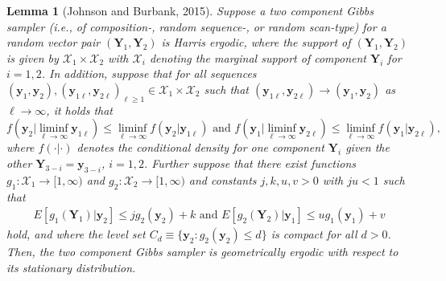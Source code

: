 \documentclass[12pt]{article}
\newtheorem{lemma}{Lemma}
\theoremstyle{definition}
\begin{document}
\begin{lemma}[Johnson and Burbank, 2015]
\label{lemma:geometric}
Suppose a two component Gibbs sampler (i.e., of composition-, random sequence-, or random scan-type) for a random vector pair $(\boldsymbol Y_1,\boldsymbol Y_2)$ is Harris ergodic, where the support of
$(\boldsymbol Y_1,\boldsymbol Y_2)$ is given by $\mathcal{X}_1\times \mathcal{X}_2$ with $\mathcal{X}_i$ denoting the marginal support of component $\boldsymbol Y_i$     for $i=1,2$.  In addition, suppose that
  for all sequences $(\boldsymbol y_{1}, \boldsymbol y_{2}), (\boldsymbol y_{1\ell}, \boldsymbol y_{2\ell})_{\ell \geq 1} \in \mathcal{X}_1\times \mathcal{X}_2$ such that $(\boldsymbol y_{1\ell}, \boldsymbol y_{2\ell}) \rightarrow (\boldsymbol y_1, \boldsymbol y_2)$ as $\ell \to \infty$,  it holds that
$$
f\left(\boldsymbol y_2|\liminf\limits_{\ell \rightarrow \infty} \boldsymbol y_{1\ell} \right) \le \liminf\limits_{\ell \rightarrow \infty} f(\boldsymbol y_2|\boldsymbol y_{1\ell}) \text{ and }
f\left(\boldsymbol y_1|\liminf\limits_{\ell \rightarrow \infty} \boldsymbol y_{2\ell} \right) \le \liminf\limits_{\ell \rightarrow \infty} f(\boldsymbol y_1|\boldsymbol y_{2\ell}),
$$
  where $f(\cdot|\cdot)$ denotes the conditional density for one component $\boldsymbol Y_i$  given the other $\boldsymbol   Y_{3-i}=\boldsymbol   y_{3-i}$, $i=1,2$. Further suppose that there exist functions $g_{1}: \mathcal{X}_1 \rightarrow [1, \infty)$ and $g_{2}:\mathcal{X}_2 \rightarrow [1, \infty)$ and constants $j,k,u,v > 0$ with $ju < 1$ such that
\begin{align}
E[g_{1}(\boldsymbol Y_1)|\boldsymbol y_2] \le jg_2(\boldsymbol y_2) + k \text{ and } E[g_{2}(\boldsymbol Y_2)|\boldsymbol y_1] \le u g_1(\boldsymbol y_1) + v  \label{thm:geometric_eqn1}
\end{align}
hold, and where the level set $C_d \equiv \{\boldsymbol y_2: g_{2}(\boldsymbol y_2) \le d\}$ is compact for all $d > 0$. Then, the two component Gibbs sampler is geometrically ergodic with respect to its stationary distribution.
\end{lemma}
\end{document}
